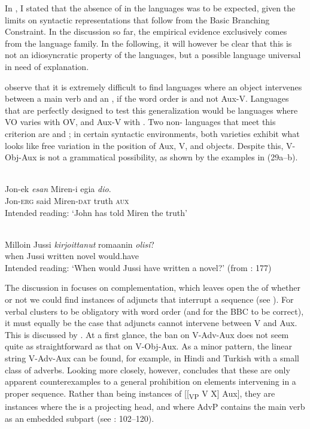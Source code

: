 \documentclass[output=paper, colorlinks, citecolor=brown]{langscibook}
\begin{document}
In , I stated that the absence of  in the  languages was to be expected, given the limits on syntactic representations that follow from the Basic Branching Constraint. In the discussion so far, the empirical evidence exclusively comes from the  language family. In the following, it will however be clear that this is not an idiosyncratic property of the  languages, but a possible language universal in need of explanation.


\citet{BiberauerEtAl2014} observe that it is extremely difficult to find languages where an object intervenes between a main verb and an , if the word order is  and not Aux-V. Languages that are perfectly designed to test this generalization would be languages where VO varies with OV, and Aux-V with . Two non- languages that meet this criterion are  and ; in certain syntactic environments, both varieties exhibit what looks like free variation in the position of Aux, V, and objects. Despite this, V-Obj-Aux is not a grammatical possibility, as shown by the examples in (29a–b).


\ea
\label{ex:sangfelt:29}
\ea {}\label{ex:sangfelt:29a}\\
\gll * Jon-ek \textit{esan} {Miren-i} {egia} \textit{dio}. \\
 {} Jon-\textsc{erg} said Miren-\textsc{dat} truth \textsc{aux}\\
\glt Intended reading: ‘John has told Miren the truth’

\ex {}\label{ex:sangfelt:29b}\\
\gll * Milloin Jussi \textit{kirjoittanut} {romaanin} \textit{olisi}? \\
 {} when Jussi written novel would.have\\
\glt Intended reading: ‘When would Jussi have written a novel?’ (from \citealt{BiberauerEtAl2014}: 177)\\
\z 
\z 


The discussion in \citet{BiberauerEtAl2014} focuses on complementation, which leaves open the  of whether or not we could find instances of adjuncts that interrupt a  sequence (see ). For verbal clusters to be obligatory with  word order (and for the BBC to be correct), it must equally be the case that adjuncts cannot intervene between V and Aux. This  is discussed by \citet{Sheehan2017Final}. At a first glance, the ban on V-Adv-Aux does not seem quite as straightforward as that on V-Obj-Aux. As a minor pattern, the linear string V-Adv-Aux can be found, for example, in Hindi and Turkish with a small class of adverbs. Looking more closely, however, \citet{Sheehan2017Final} concludes that these are only apparent counterexamples to a general prohibition on elements intervening in a proper  sequence. Rather than being instances of [[\textsubscript{VP} V X] Aux], they are instances where the  is a projecting head, and where AdvP contains the main verb as an embedded subpart (see \citealt{Sheehan2017Final}: 102–120).
\end{document}
